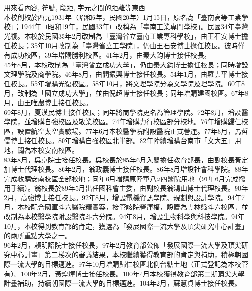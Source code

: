 
\newpage
{}
用來看內容, 符號, 段距, 字元之間的距離等東西\\

本校創校於西元1931年（昭和6年，民國20年）1月15日，原名為「臺南高等工業學校」；1944年（昭和19年，民國33年）改稱為「臺南工業專門學校」。民國34年臺灣光復。本校於民國35年2月改制為「臺灣省立臺南工業專科學校」，由王石安博士擔任校長；35年10月改制為「臺灣省立工學院」，仍由王石安博士擔任校長。彼時僅有成功校區，39年增購勝利校區。41年2月，由秦大鈞博士接任校長。\\

45年8月，本校改制為「臺灣省立成功大學」，仍由秦大鈞博士擔任校長；同時增設文理學院及商學院。46年8月，由閻振興博士接任校長。54年1月，由羅雲平博士接任校長。55年增購光復校區。58年10月，將文理學院分為文學院及理學院。60年8月，改制為「國立成功大學」，並由倪超博士接任校長；同年增購建國校區。67年8月，由王唯農博士接任校長。\\

69年8月，夏漢民博士接任校長；同年將商學院更名為管理學院。72年8月，增設醫學院，並增購自強校區及敬業校區。74年增購力行校區部分校地。76年增購歸仁校區，設置航空太空實驗場。77年6月本校醫學院附設醫院正式營運。77年8月，馬哲儒博士接任校長。80年增購自強校區北半部。82年陸續增購台南市「文大五」用地，闢為本校安南校區。\\

83年8月，吳京院士接任校長。吳校長於85年6月入閣擔任教育部長，由副校長黃定加博士代理校長。86年2月，翁政義博士接任校長。86年8月增設社會科學院。88年完成收購安南校區全部校地；同年6月增購原陸軍八○四醫院用地（91年6月完成撥用手續）。翁校長於89年5月出任國科會主委，由副校長翁鴻山博士代理校長。90年2月，高強博士接任校長。92年8月，增設電機資訊學院、規劃與設計學院。94年7月，本校配合國軍斗六醫院精實案，接管該院營運權，設置為雲林縣斗六校區，並改制為本校醫學院附設醫院斗六分院。94年8月，增設生物科學與科技學院。94年10月，本校得到教育部的肯定，獲選為「發展國際一流大學及頂尖研究中心計畫」的兩所重點大學之一。\\

96年2月，賴明詔院士接任校長，97年2月教育部公佈「發展國際一流大學及頂尖研究中心計畫」第二梯次的審議結果，本校繼續獲得教育部的肯定與補助，積極朝國際一流大學的目標邁進。97年10月增購歸仁校區北側台糖土地（正式登記為本校管有）。100年2月，黃煌煇博士接任校長。100年4月本校獲得教育部第二期頂尖大學計畫補助，持續朝國際一流大學的目標邁進。104年2月，蘇慧貞博士接任校長。

\UseDefaultLinesSpacing

